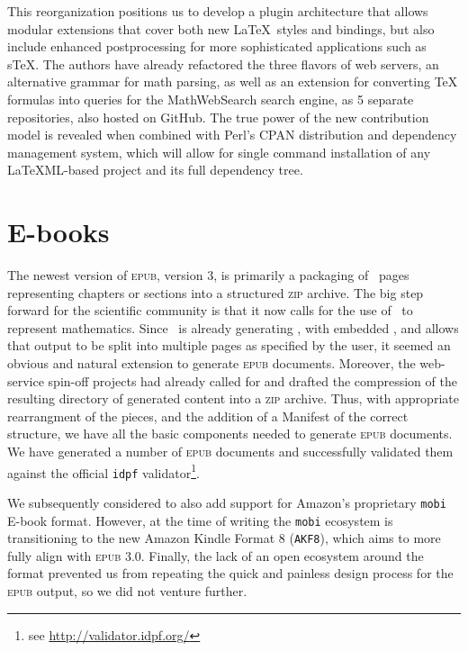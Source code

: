 \documentclass{llncs}
\def\ebook{\mbox{E-book}\xspace}
\def\ebooks{\mbox{E-books}\xspace}
\def\epub{\textsc{epub}\xspace}
\def\zip{\textsc{zip}\xspace}
\begin{document}
This reorganization positions us to develop a plugin architecture that allows modular extensions
that cover both new \LaTeX\ styles and bindings, but also
include enhanced postprocessing for more sophisticated applications
such as s\TeX. The authors have already refactored the three flavors of {\LaTeXML} web servers, an alternative grammar for math parsing,
as well as an extension for converting {\TeX} formulas into queries for the MathWebSearch search engine, as 5 separate repositories, also hosted on GitHub.
The true power of the new contribution model is revealed when combined with Perl's CPAN distribution and dependency management system,
 which will allow for single command installation of any LaTeXML-based project and its full dependency tree.

\section{\ebooks}\label{ebooks}
The newest version of \epub, version 3, is primarily a packaging
of \HTML\ pages representing chapters or sections into a structured
\zip archive. The big step forward for the scientific community
is that it now calls for the use of \MathML\
to represent mathematics. Since \LaTeXML\ is already generating \HTML,
with embedded \MathML, and allows that output to be split into
multiple pages as specified by the user, it seemed an obvious
and natural extension to generate \epub documents. Moreover, the
web-service spin-off projects had already called for and drafted the compression of the resulting
directory of generated content into a \zip
archive.  Thus, with appropriate rearrangment of the pieces,
and the addition of a Manifest of the correct structure,
we have all the basic components needed to generate \epub documents. We have generated a number of \epub documents and successfully validated them against the official \texttt{idpf} validator\footnote{see \url{http://validator.idpf.org/}}.

We subsequently considered to also add support for Amazon's proprietary \texttt{mobi} \ebook format. However, at the time of writing the \texttt{mobi} ecosystem is transitioning to the new Amazon Kindle Format 8 (\texttt{AKF8}), which aims to more fully align with \epub 3.0. Finally, the lack of an open ecosystem around the format prevented us from repeating the quick and painless design process for the \epub output, so we did not venture further.
\end{document}
